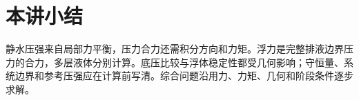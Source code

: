 \section{本讲小结}
静水压强来自局部力平衡，压力合力还需积分方向和力矩。浮力是完整排液边界压力的合力，多层液体分别计算。底压比较与浮体稳定性都受几何影响；守恒量、系统边界和参考压强应在计算前写清。综合问题沿用力、力矩、几何和阶段条件逐步求解。
